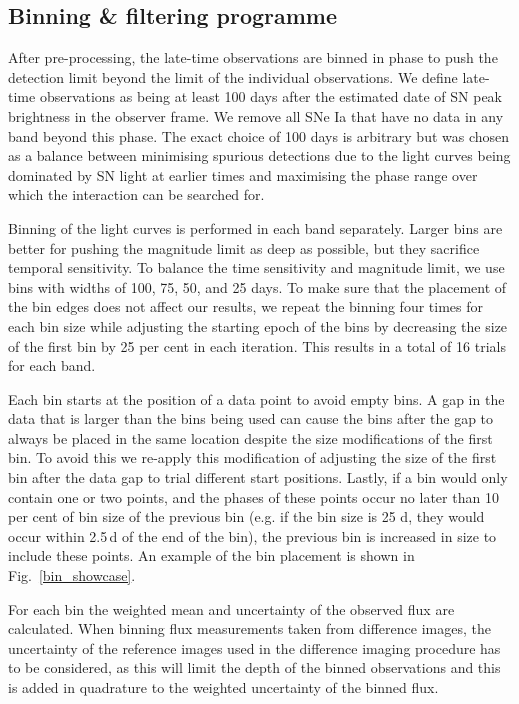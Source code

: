 \documentclass[a4paper,oneside,12pt, class=Latex/Classes/PhDthesisPSnPDF, crop=false]{standalone}
\begin{document}
\subsection{Binning \& filtering programme}
\label{pipeline}

After pre-processing, the late-time observations are binned in phase to push the detection limit beyond the limit of the individual observations. We define late-time observations as being at least 100 days after the estimated date of SN peak brightness in the observer frame. We remove all SNe Ia that have no data in any band beyond this phase. The exact choice of 100 days is arbitrary but was chosen as a balance between minimising spurious detections due to the light curves being dominated by SN light at earlier times and maximising the phase range over which the interaction can be searched for. 

Binning of the light curves is performed in each band separately. Larger bins are better for pushing the magnitude limit as deep as possible, but they sacrifice temporal sensitivity. To balance the time sensitivity and magnitude limit, we use bins with widths of 100, 75, 50, and 25 days. To make sure that the placement of the bin edges does not affect our results, we repeat the binning four times for each bin size while adjusting the starting epoch of the bins by decreasing the size of the first bin by 25 per cent in each iteration. This results in a total of 16 trials for each band. 

Each bin starts at the position of a data point to avoid empty bins. A gap in the data that is larger than the bins being used can cause the bins after the gap to always be placed in the same location despite the size modifications of the first bin. To avoid this we re-apply this modification of adjusting the size of the first bin after the data gap to trial different start positions. Lastly, if a bin would only contain one or two points, and the phases of these points occur no later than 10 per cent of bin size of the previous bin (e.g. if the bin size is 25 d, they would occur within 2.5\,d of the end of the bin), the previous bin is increased in size to include these points. An example of the bin placement is shown in Fig.~\ref{bin_showcase}.

For each bin the weighted mean and uncertainty of the observed flux are calculated. When binning flux measurements taken from difference images, the uncertainty of the reference images used in the difference imaging procedure has to be considered, as this will limit the depth of the binned observations \citep{ref_uncert} and this is added in quadrature to the weighted uncertainty of the binned flux. 
\end{document}
